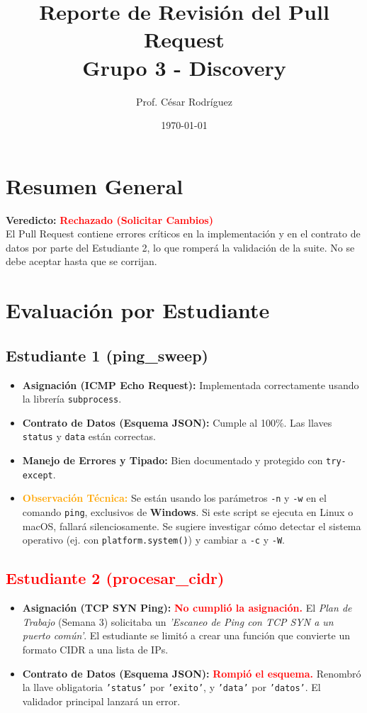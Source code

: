 \documentclass[12pt,a4paper]{article}
\title{Reporte de Revisión del Pull Request \\ \large Grupo 3 - Discovery}
\author{Prof. César Rodríguez}
\date{\today}
\begin{document}
\maketitle

\section*{Resumen General}
\textbf{Veredicto:} \textcolor{red}{\textbf{Rechazado (Solicitar Cambios)}} \\
El Pull Request contiene errores críticos en la implementación y en el contrato de datos por parte del Estudiante 2, lo que romperá la validación de la suite. No se debe aceptar hasta que se corrijan.

\section*{Evaluación por Estudiante}

\subsection*{\textcolor{green!70!black}{Estudiante 1 (ping\_sweep)}}
\begin{itemize}[label=$\bullet$]
    \item \textbf{Asignación (ICMP Echo Request):} Implementada correctamente usando la librería \texttt{subprocess}.
    \item \textbf{Contrato de Datos (Esquema JSON):} Cumple al 100\%. Las llaves \texttt{status} y \texttt{data} están correctas.
    \item \textbf{Manejo de Errores y Tipado:} Bien documentado y protegido con \texttt{try-except}.
    \item \textbf{\textcolor{orange}{Observación Técnica:}} Se están usando los parámetros \texttt{-n} y \texttt{-w} en el comando \texttt{ping}, exclusivos de \textbf{Windows}. Si este script se ejecuta en Linux o macOS, fallará silenciosamente. Se sugiere investigar cómo detectar el sistema operativo (ej. con \texttt{platform.system()}) y cambiar a \texttt{-c} y \texttt{-W}.
\end{itemize}

\subsection*{\textcolor{red}{Estudiante 2 (procesar\_cidr)}}
\begin{itemize}[label=$\bullet$]
    \item \textbf{Asignación (TCP SYN Ping):} \textbf{\textcolor{red}{No cumplió la asignación.}} El \textit{Plan de Trabajo} (Semana 3) solicitaba un \textit{'Escaneo de Ping con TCP SYN a un puerto común'}. El estudiante se limitó a crear una función que convierte un formato CIDR a una lista de IPs.
    \item \textbf{Contrato de Datos (Esquema JSON):} \textbf{\textcolor{red}{Rompió el esquema.}} Renombró la llave obligatoria \texttt{'status'} por \texttt{'exito'}, y \texttt{'data'} por \texttt{'datos'}. El validador principal lanzará un error.
\end{itemize}
\end{document}
